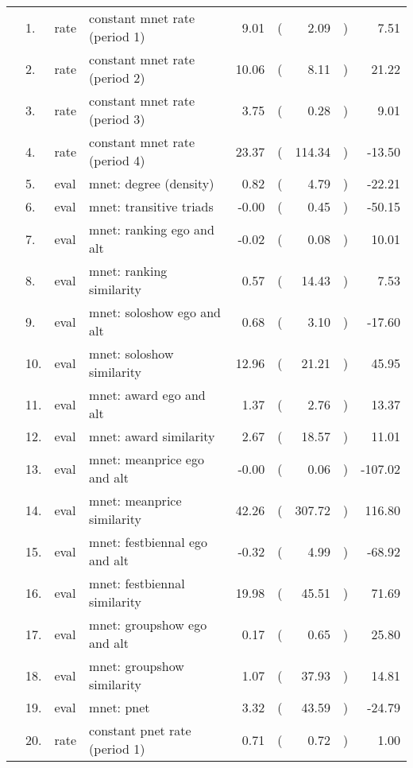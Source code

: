 \begin{table}[ht]
\centering
\begin{tabular}{llllrlrlr}
  \hline
  \hline
  &  1. & rate & constant mnet rate (period 1) & 9.01 & ( & 2.09 & ) & 7.51 \\ 
    &  2. & rate & constant mnet rate (period 2) & 10.06 & ( & 8.11 & ) & 21.22 \\ 
    &  3. & rate & constant mnet rate (period 3) & 3.75 & ( & 0.28 & ) & 9.01 \\ 
    &  4. & rate & constant mnet rate (period 4) & 23.37 & ( & 114.34 & ) & -13.50 \\ 
    &  5. & eval & mnet: degree (density) & 0.82 & ( & 4.79 & ) & -22.21 \\ 
    &  6. & eval & mnet: transitive triads & -0.00 & ( & 0.45 & ) & -50.15 \\ 
    &  7. & eval & mnet: ranking ego and alt & -0.02 & ( & 0.08 & ) & 10.01 \\ 
    &  8. & eval & mnet: ranking similarity & 0.57 & ( & 14.43 & ) & 7.53 \\ 
    &  9. & eval & mnet: soloshow ego and alt & 0.68 & ( & 3.10 & ) & -17.60 \\ 
    & 10. & eval & mnet: soloshow similarity & 12.96 & ( & 21.21 & ) & 45.95 \\ 
    & 11. & eval & mnet: award ego and alt & 1.37 & ( & 2.76 & ) & 13.37 \\ 
    & 12. & eval & mnet: award similarity & 2.67 & ( & 18.57 & ) & 11.01 \\ 
    & 13. & eval & mnet: meanprice ego and alt & -0.00 & ( & 0.06 & ) & -107.02 \\ 
    & 14. & eval & mnet: meanprice similarity & 42.26 & ( & 307.72 & ) & 116.80 \\ 
    & 15. & eval & mnet: festbiennal ego and alt & -0.32 & ( & 4.99 & ) & -68.92 \\ 
    & 16. & eval & mnet: festbiennal similarity & 19.98 & ( & 45.51 & ) & 71.69 \\ 
    & 17. & eval & mnet: groupshow ego and alt & 0.17 & ( & 0.65 & ) & 25.80 \\ 
    & 18. & eval & mnet: groupshow similarity & 1.07 & ( & 37.93 & ) & 14.81 \\ 
    & 19. & eval & mnet: pnet & 3.32 & ( & 43.59 & ) & -24.79 \\ 
    & 20. & rate & constant pnet rate (period 1) & 0.71 & ( & 0.72 & ) & 1.00 \\ 

\end{tabular}
\end{table}
